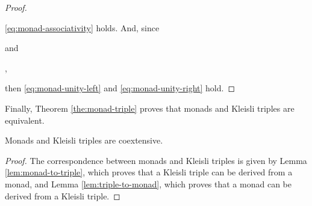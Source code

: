 \begin{lemma}
\begin{proof}
\begin{steps}
    \end{steps}
    \eqref{eq:monad-associativity} holds. And, since
    \begin{steps}
    \end{steps}
    and
    \begin{steps}
        \eqby{\eqref{eq:triple-unity-right}}
      ,
    \end{steps}
    then \eqref{eq:monad-unity-left} and \eqref{eq:monad-unity-right}
    hold.
  \end{proof}
\end{lemma}

Finally, Theorem \ref{the:monad-triple} proves that monads and Kleisli triples
are equivalent.

\begin{theorem}
  \label{the:monad-triple}
  Monads and Kleisli triples are coextensive.
  \begin{proof}
    The correspondence between monads and Kleisli triples is given by Lemma
    \ref{lem:monad-to-triple}, which proves that a Kleisli triple can be
    derived from a monad, and Lemma \ref{lem:triple-to-monad}, which proves
    that a monad can be derived from a Kleisli triple.
  \end{proof}
\end{theorem}

